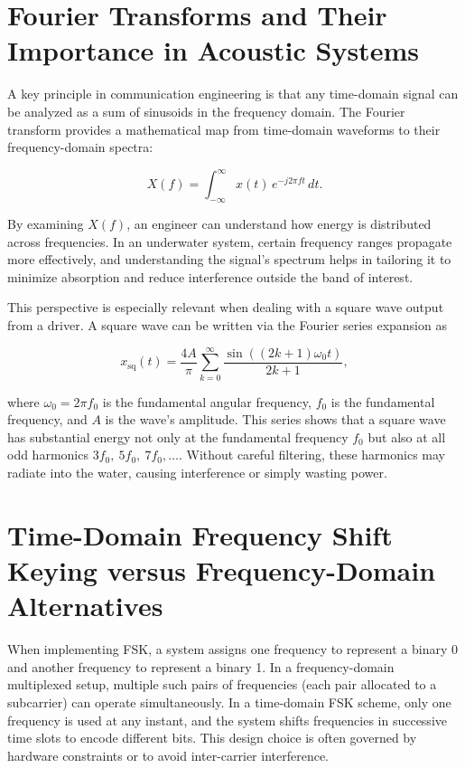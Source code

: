\section{Fourier Transforms and Their Importance in Acoustic Systems}

A key principle in communication engineering is that any time-domain signal can be analyzed as a sum of sinusoids in the frequency domain. The Fourier transform provides a mathematical map from time-domain waveforms to their frequency-domain spectra:

\[
X(f) = \int_{-\infty}^{\infty} x(t)\,e^{-j 2\pi f t} \, dt.
\]

By examining \( X(f) \), an engineer can understand how energy is distributed across frequencies. In an underwater system, certain frequency ranges propagate more effectively, and understanding the signal's spectrum helps in tailoring it to minimize absorption and reduce interference outside the band of interest. 

This perspective is especially relevant when dealing with a square wave output from a driver. A square wave can be written via the Fourier series expansion as

\[
x_{\text{sq}}(t) = \frac{4A}{\pi} \sum_{k=0}^{\infty} \frac{\sin((2k+1)\omega_0 t)}{2k+1},
\]

where \(\omega_0 = 2\pi f_0\) is the fundamental angular frequency, \(f_0\) is the fundamental frequency, and \(A\) is the wave's amplitude. This series shows that a square wave has substantial energy not only at the fundamental frequency \(f_0\) but also at all odd harmonics \(3f_0,\ 5f_0,\ 7f_0,\ldots\). Without careful filtering, these harmonics may radiate into the water, causing interference or simply wasting power.

\section{Time-Domain Frequency Shift Keying versus Frequency-Domain Alternatives}

When implementing FSK, a system assigns one frequency to represent a binary 0 and another frequency to represent a binary 1. In a frequency-domain multiplexed setup, multiple such pairs of frequencies (each pair allocated to a subcarrier) can operate simultaneously. In a time-domain FSK scheme, only one frequency is used at any instant, and the system shifts frequencies in successive time slots to encode different bits. This design choice is often governed by hardware constraints or to avoid inter-carrier interference.


